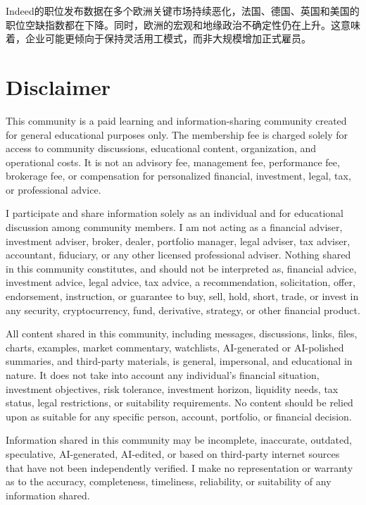 \documentclass[11pt]{ctexart}
\begin{document}
Indeed的职位发布数据在多个欧洲关键市场持续恶化，法国、德国、英国和美国的职位空缺指数都在下降。同时，欧洲的宏观和地缘政治不确定性仍在上升。这意味着，企业可能更倾向于保持灵活用工模式，而非大规模增加正式雇员。

\section{Disclaimer}
{\scriptsize\color{refgray}
This community is a paid learning and information-sharing community created for general educational purposes only. The membership fee is charged solely for access to community discussions, educational content, organization, and operational costs. It is not an advisory fee, management fee, performance fee, brokerage fee, or compensation for personalized financial, investment, legal, tax, or professional advice.\par
I participate and share information solely as an individual and for educational discussion among community members. I am not acting as a financial adviser, investment adviser, broker, dealer, portfolio manager, legal adviser, tax adviser, accountant, fiduciary, or any other licensed professional adviser. Nothing shared in this community constitutes, and should not be interpreted as, financial advice, investment advice, legal advice, tax advice, a recommendation, solicitation, offer, endorsement, instruction, or guarantee to buy, sell, hold, short, trade, or invest in any security, cryptocurrency, fund, derivative, strategy, or other financial product.\par
All content shared in this community, including messages, discussions, links, files, charts, examples, market commentary, watchlists, AI-generated or AI-polished summaries, and third-party materials, is general, impersonal, and educational in nature. It does not take into account any individual's financial situation, investment objectives, risk tolerance, investment horizon, liquidity needs, tax status, legal restrictions, or suitability requirements. No content should be relied upon as suitable for any specific person, account, portfolio, or financial decision.\par
Information shared in this community may be incomplete, inaccurate, outdated, speculative, AI-generated, AI-edited, or based on third-party internet sources that have not been independently verified. I make no representation or warranty as to the accuracy, completeness, timeliness, reliability, or suitability of any information shared.\par
}
\end{document}
